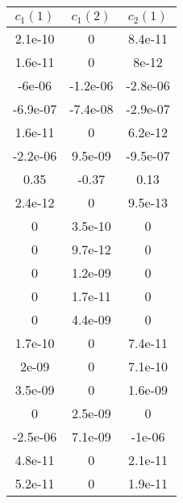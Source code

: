 \begin{tiny}\begin{tabular}{|c|c|c|}
\hline
\textbf{$c_1(1)$}&\textbf{$c_1(2)$}&\textbf{$c_2(1)$}\\\hline
2.1e-10&0&8.4e-11\\\hline
1.6e-11&0&8e-12\\\hline
-6e-06&-1.2e-06&-2.8e-06\\\hline
-6.9e-07&-7.4e-08&-2.9e-07\\\hline
1.6e-11&0&6.2e-12\\\hline
-2.2e-06&9.5e-09&-9.5e-07\\\hline
0.35&-0.37&0.13\\\hline
2.4e-12&0&9.5e-13\\\hline
0&3.5e-10&0\\\hline
0&9.7e-12&0\\\hline
0&1.2e-09&0\\\hline
0&1.7e-11&0\\\hline
0&4.4e-09&0\\\hline
1.7e-10&0&7.4e-11\\\hline
2e-09&0&7.1e-10\\\hline
3.5e-09&0&1.6e-09\\\hline
0&2.5e-09&0\\\hline
-2.5e-06&7.1e-09&-1e-06\\\hline
4.8e-11&0&2.1e-11\\\hline
5.2e-11&0&1.9e-11\\\hline
\end{tabular}
\end{tiny}